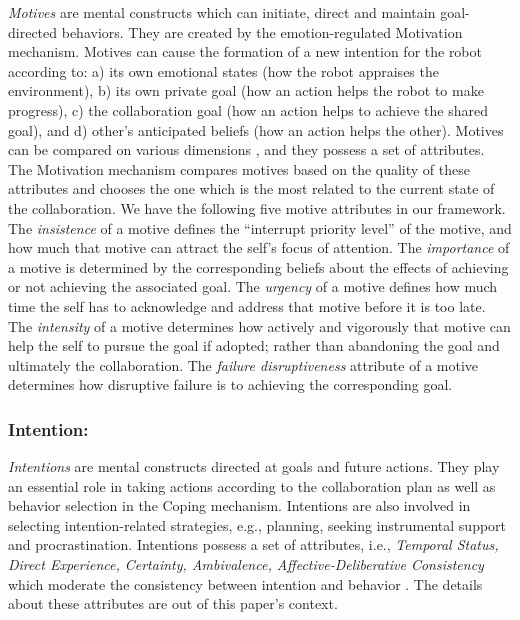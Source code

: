 \documentclass{aamas2016}
\begin{document}
\textit{Motives} are mental constructs which can initiate, direct and maintain
goal-directed behaviors. They are created by the emotion-regulated Motivation
mechanism. Motives can cause the formation of a new intention for the robot
according to: a) its own emotional states (how the robot appraises the
environment), b) its own private goal (how an action helps the robot to make
progress), c) the collaboration goal (how an action helps to achieve the shared
goal), and d) other's anticipated beliefs (how an action helps the other).
Motives can be compared on various dimensions \cite{sloman:motivation}, and
they possess a set of attributes. The Motivation mechanism compares motives
based on the quality of these attributes and chooses the one which is the most
related to the current state of the collaboration. We have the following five
motive attributes in our framework. The \textit{insistence} of a motive defines
the ``interrupt priority level'' of the motive, and how much that motive can
attract the self's focus of attention. The \textit{importance} of a motive is
determined by the corresponding beliefs about the effects of achieving or not
achieving the associated goal. The \textit{urgency} of a motive defines how much
time the self has to acknowledge and address that motive before it is too late.
The \textit{intensity} of a motive determines how actively and vigorously that
motive can help the self to pursue the goal if adopted; rather than abandoning
the goal and ultimately the collaboration. The \textit{failure disruptiveness}
attribute of a motive determines how disruptive failure is to achieving the
corresponding goal.

\subsubsection{Intention:}

\textit{Intentions} are mental constructs directed at goals and future actions.
They play an essential role in taking actions according to the collaboration
plan as well as behavior selection in the Coping mechanism. Intentions are
also involved in selecting intention-related strategies, e.g., planning, seeking
instrumental support and procrastination. Intentions possess a set of
attributes, i.e., \textit{Temporal Status, Direct Experience, Certainty,
Ambivalence, Affective-Deliberative Consistency} which moderate the consistency
between intention and behavior \cite{cooke:intention-behavior-consistency}. The
details about these attributes are out of this paper's context.
\end{document}
